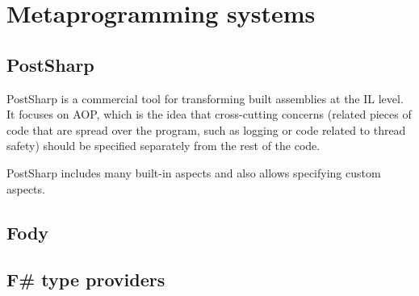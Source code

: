 \section{Metaprogramming systems}
\label{metaprogramming}

\subsection{PostSharp}

PostSharp \cite{postsharp} is a commercial tool for transforming built assemblies at the \ac{IL} level. It focuses on \ac{AOP}, which is the idea that cross-cutting concerns (related pieces of code that are spread over the program, such as logging or code related to thread safety) should be specified separately from the rest of the code.

PostSharp includes many built-in aspects and also allows specifying custom aspects.


\subsection{Fody}

\subsection{F\# type providers}

